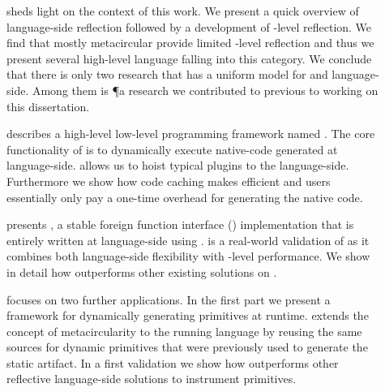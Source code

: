 \begin{description}
\item[] sheds light on the context of this work.
	We present a quick overview of language-side reflection followed by a development of \VM-level reflection.
	We find that mostly metacircular \VMs provide limited \VM-level reflection and thus we present several high-level language \VMs falling into this category.
	We conclude that there is only two research \VM that has a uniform model for \VM and language-side.
	Among them is \P a research \ST \VM we contributed to previous to working on this dissertation.


\item[] describes a high-level low-level programming framework named \B.
	The core functionality of \B is to dynamically execute native-code generated at language-side.
	\B allows us to hoist typical \VM plugins to the language-side.
	Furthermore we show how code caching makes \B efficient and users essentially only pay a one-time overhead for generating the native code.
	
\item[] presents \NB, a stable foreign function interface (\FFI) implementation that is entirely written at language-side using \B.
	\NB is a real-world validation of \B as it combines both language-side flexibility with \VM-level performance.
	We show in detail how \NB outperforms other existing \FFI solutions on \PH.

\item[] focuses on two further \B applications.
	In the first part we present \WF a framework for dynamically generating primitives at runtime.
	\WF extends the concept of metacircularity to the running language by reusing the same sources for dynamic primitives that were previously used to generate the static \VM artifact.
	In a first validation we show how \WF outperforms other reflective language-side solutions to instrument primitives.
	

\end{description}
